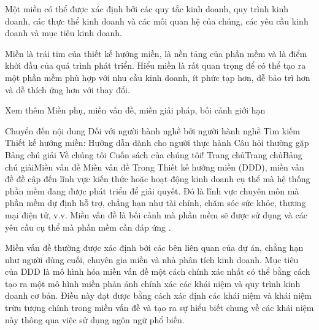 Một miền có thể được xác định bởi các quy tắc kinh doanh, quy trình kinh doanh, các thực thể kinh doanh và các mối quan hệ của chúng, các yêu cầu kinh doanh và mục tiêu kinh doanh.

Miền là trái tim của thiết kế hướng miền, là nền tảng của phần mềm và là điểm khởi đầu của quá trình phát triển. Hiểu miền là rất quan trọng để có thể tạo ra một phần mềm phù hợp với nhu cầu kinh doanh, ít phức tạp hơn, dễ bảo trì hơn và dễ thích ứng hơn với thay đổi.

Xem thêm	 Miền phụ, miền vấn đề, miền giải pháp, bối cảnh giới hạn




Chuyển đến nội dung
Đối với người hành nghề bởi người hành nghề
Tìm kiếm
Thiết kế hướng miền: Hướng dẫn dành cho người thực hành
Câu hỏi thường gặp
Bảng chú giải
Về chúng tôi
Cuốn sách của chúng tôi!
Trang chủTrang chủBảng chú giảiMiền vấn đề
Miền vấn đề
Trong Thiết kế hướng miền (DDD), miền vấn đề đề cập đến lĩnh vực kiến ​​thức hoặc hoạt động kinh doanh cụ thể mà hệ thống phần mềm đang được phát triển để giải quyết. Đó là lĩnh vực chuyên môn mà phần mềm dự định hỗ trợ, chẳng hạn như tài chính, chăm sóc sức khỏe, thương mại điện tử, v.v. Miền vấn đề là bối cảnh mà phần mềm sẽ được sử dụng và các yêu cầu cụ thể mà phần mềm cần đáp ứng .

Miền vấn đề thường được xác định bởi các bên liên quan của dự án, chẳng hạn như người dùng cuối, chuyên gia miền và nhà phân tích kinh doanh. Mục tiêu của DDD là mô hình hóa miền vấn đề một cách chính xác nhất có thể bằng cách tạo ra một mô hình miền phản ánh chính xác các khái niệm và quy trình kinh doanh cơ bản. Điều này đạt được bằng cách xác định các khái niệm và khái niệm trừu tượng chính trong miền vấn đề và tạo ra sự hiểu biết chung về các khái niệm này thông qua việc sử dụng ngôn ngữ phổ biến.

